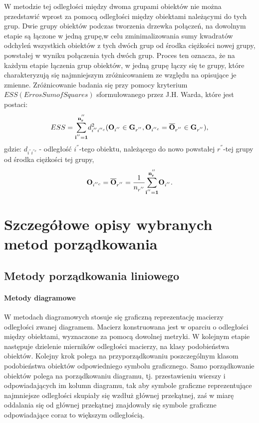 \documentclass[12pt,a4paper]{report}
\begin{document}
W metodzie tej odległości między dwoma grupami obiektów nie można przedstawić wprost za pomocą odległości między obiektami należącymi do tych grup. Dwie grupy obiektów podczas tworzenia drzewka połączeń, na dowolnym etapie są łączone w jedną grupę,w celu zminimalizowania sumy kwadratów odchyleń wszystkich obiektów z tych dwóch grup od środka ciężkości nowej grupy, powstałej w wyniku połączenia tych dwóch grup. Proces ten oznacza, że na każdym etapie łączenia grup obiektów, w jedną grupę łączy się te grupy, które charakteryzują się najmniejszym zróżnicowaniem ze względu na opisujące je zmienne. Zróżnicowanie badania się przy pomocy kryterium $ESS (Erros Sum of Squares)$ sformułowanego przez J.H. Warda, które jest postaci:
\begin{equation}
ESS= \bold{\sum_{i^{''}=1}^{n_r^{''}}} d_{i^{''}i^{''c}}^2 ( \bold{O}_{i^{''}} \in \bold{G}_{r^{''}}, \bold{O}_{i^{''c}}=\bold{\overline{O}}_{r^{''}} \in \bold{G}_{r^{''}} ),
\end{equation} 
gdzie:
$d_{i^{''}i^{''c}}$ - odległość $i^{''}$-tego obiektu, należącego do nowo powstałej $r^{''}$-tej grupy od środka ciężkości tej grupy,\\
\begin{equation}
\bold{O}_{i^{''c}} = \bold{\overline{O}}_{r^{''}}=\frac{1}{n_{r^{''}}} \bold{\sum_{i^{''}=1}^{n_r^{''}}} \bold{O}_{i^{''}}.
\end{equation}

\newpage
\chapter{Szczegółowe opisy wybranych metod porządkowania}
\section{Metody porządkowania liniowego}
\subsubsection{Metody diagramowe}
\noindent

W metodach diagramowych stosuje się graficzną reprezentację macierzy odległości zwanej diagramem. Macierz konstruowana jest w oparciu o odległości między obiektami, wyznaczone za pomocą dowolnej metryki. W kolejnym etapie następuje dzielenie mierników odległości macierzy, na klasy podobieństwa obiektów. Kolejny krok polega na przyporządkowaniu poszczególnym klasom podobieństwa obiektów odpowiedniego symbolu graficznego. Samo porządkowanie obiektów polega na porządkowaniu diagramu, tj. przestawieniu wierszy i odpowiadających im kolumn diagramu, tak aby symbole graficzne reprezentujące najmniejsze odległości skupiały się wzdłuż głównej przekątnej, zaś w miarę oddalania się od głównej przekątnej znajdowały się symbole graficzne odpowiadające coraz to większym odległością. 
\end{document}
